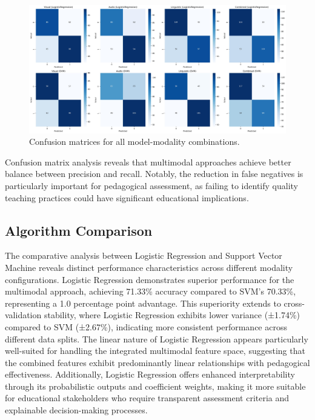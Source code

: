 \begin{figure}[H]
    \centering
    \includegraphics[width=\textwidth]{sections/confusion_matrices.jpg}
    \caption{Confusion matrices for all model-modality combinations.} \label{fig:confusion_matrices}
\end{figure}

Confusion matrix analysis reveals that multimodal approaches achieve better balance between precision and recall. Notably, the reduction in false negatives is particularly important for pedagogical assessment, as failing to identify quality teaching practices could have significant educational implications.

\subsection{Algorithm Comparison}

The comparative analysis between Logistic Regression and Support Vector Machine reveals distinct performance characteristics across different modality configurations. Logistic Regression demonstrates superior performance for the multimodal approach, achieving 71.33\% accuracy compared to SVM's 70.33\%, representing a 1.0 percentage point advantage. This superiority extends to cross-validation stability, where Logistic Regression exhibits lower variance (±1.74\%) compared to SVM (±2.67\%), indicating more consistent performance across different data splits. The linear nature of Logistic Regression appears particularly well-suited for handling the integrated multimodal feature space, suggesting that the combined features exhibit predominantly linear relationships with pedagogical effectiveness. Additionally, Logistic Regression offers enhanced interpretability through its probabilistic outputs and coefficient weights, making it more suitable for educational stakeholders who require transparent assessment criteria and explainable decision-making processes.

